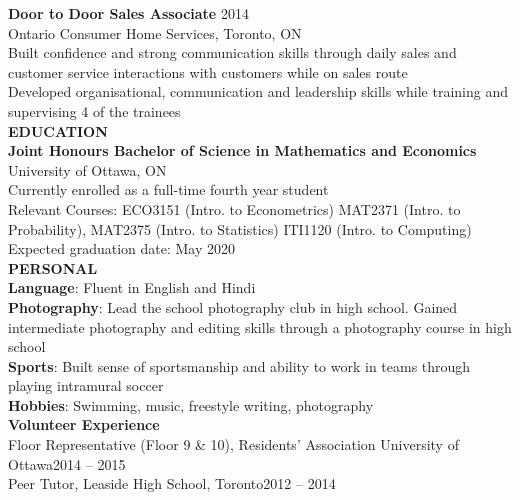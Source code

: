{\textbf{Door to Door Sales Associate} \hfill 2014\\ 	 	
Ontario Consumer Home Services, Toronto, ON\\
\raisebox{0.25ex}{\tiny$\bullet$} Built confidence and strong communication skills through daily sales and customer service interactions with customers while on sales route\\
\raisebox{0.25ex}{\tiny$\bullet$} Developed organisational, communication and leadership skills while training and supervising 4 of the trainees\\

\textbf{\large{EDUCATION}}\\
\textbf{Joint Honours Bachelor of Science in Mathematics and Economics}\\
University of Ottawa, ON\\
\raisebox{0.25ex}{\tiny$\bullet$} Currently enrolled as a full-time fourth year student\\ 
\raisebox{0.25ex}{\tiny$\bullet$} Relevant Courses: ECO3151 (Intro. to Econometrics) MAT2371 (Intro. to Probability), MAT2375 (Intro. to Statistics) ITI1120 (Intro. to Computing)\\
\raisebox{0.25ex}{\tiny$\bullet$} Expected graduation date: May 2020\\

\textbf{\large{PERSONAL}}\\
\textbf{Language}: Fluent in English and Hindi\\
\textbf{Photography}: Lead the school photography club in high school. Gained intermediate photography and editing skills through a photography course in high school\\
\textbf{Sports}: Built sense of sportsmanship and ability to work in teams through playing intramural soccer\\ 
\textbf{Hobbies}: Swimming, music, freestyle writing, photography\\
\textbf{Volunteer Experience}\\
\raisebox{0.25ex}{\tiny$\bullet$} Floor Representative (Floor 9 \& 10), Residents’ Association University of Ottawa\hfill 2014 – 2015\\
\raisebox{0.25ex}{\tiny$\bullet$} Peer Tutor, Leaside High School, Toronto\hfill 2012 – 2014\\

}